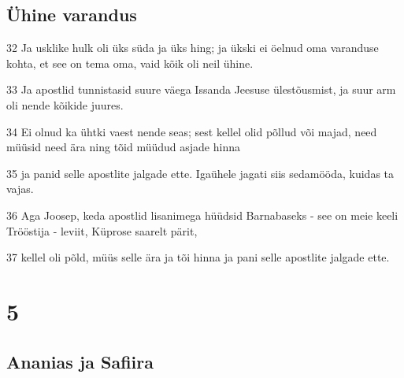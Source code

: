 \section*{Ühine varandus}

\par 32 Ja usklike hulk oli üks süda ja üks hing; ja ükski ei öelnud oma varanduse kohta, et see on tema oma, vaid kõik oli neil ühine.
\par 33 Ja apostlid tunnistasid suure väega Issanda Jeesuse ülestõusmist, ja suur arm oli nende kõikide juures.
\par 34 Ei olnud ka ühtki vaest nende seas; sest kellel olid põllud või majad, need müüsid need ära ning tõid müüdud asjade hinna
\par 35 ja panid selle apostlite jalgade ette. Igaühele jagati siis sedamööda, kuidas ta vajas.
\par 36 Aga Joosep, keda apostlid lisanimega hüüdsid Barnabaseks - see on meie keeli Trööstija - leviit, Küprose saarelt pärit,
\par 37 kellel oli põld, müüs selle ära ja tõi hinna ja pani selle apostlite jalgade ette.


\chapter{5}

\section*{Ananias ja Safiira}

